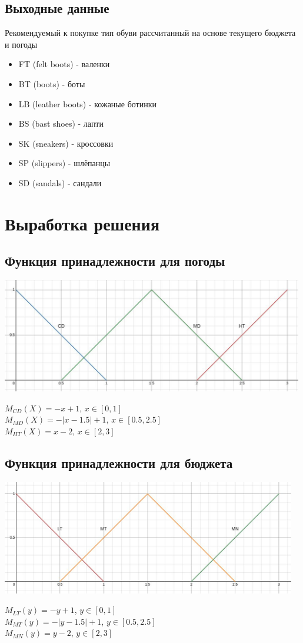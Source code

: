 \documentclass[12pt,a4paper]{report}
\begin{document}
\subsection*{Выходные данные}
Рекомендуемый к покупке тип обуви рассчитанный на основе текущего бюджета и погоды
\begin{itemize}
    \item FT (felt boots) - валенки
    \item BT (boots) - боты
    \item LB (leather boots) - кожаные ботинки
    \item BS (bast shoes) - лапти
    \item SK (sneakers) - кроссовки
    \item SP (slippers) - шлёпанцы
    \item SD (sandals) - сандали
\end{itemize}
\newpage
\section*{Выработка решения}
\subsection*{Функция принадлежности для погоды}
\begin{center}
\includegraphics*[height=5cm]{func_1.jpg}    
\end{center}
$M_{CD}(X) = -x+1$, $x \in [0, 1]$ \\
$M_{MD}(X) = - |x-1.5|+1$, $x \in [0.5, 2.5]$ \\
$M_{HT}(X) = x-2$, $x \in [2, 3]$ \\
\subsection*{Функция принадлежности для бюджета}
\begin{center}
\includegraphics*[height=5cm]{func_2.jpg}    
\end{center}
$M_{LT}(y) = -y+1$, $y \in [0, 1]$ \\
$M_{MT}(y) = - |y-1.5|+1$, $y \in [0.5, 2.5]$ \\
$M_{MN }(y) = y-2$, $y \in [2, 3]$ \\
\newpage
\end{document}
